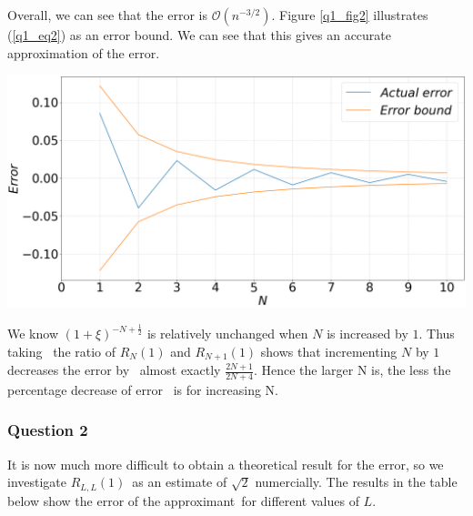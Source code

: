 \documentclass[12pt, a4paper]{article}
\begin{document}
Overall, we can see that the error is $\mathcal{O}(n^{-3/2})$.
Figure \ref{q1_fig2} illustrates (\ref{q1_eq2}) as an error bound. 
We can see that this gives an accurate approximation of the error.

\vspace{0.3cm}
\begin{minipage}{\textwidth}
	\includegraphics[width=\linewidth]{q1_fig2}
	\label{q1_fig2}
\end{minipage}
\vspace{0.4cm}

We know $(1+\xi)^{-N + \frac{1}{2}}$ is relatively unchanged when $N$ is increased by $1$. Thus taking \
the ratio of $R_{N}(1)$ and $R_{N+1}(1)$ shows that incrementing $N$ by $1$ decreases the error by \
almost exactly $\frac{ 2N+1 }{ 2N+4 }$. Hence the larger N is, the less the percentage decrease of error \
is for increasing N.

\newpage

\subsubsection*{Question 2}

It is now much more difficult to obtain a theoretical result for the error, so we investigate $R_{L,L}(1)$\
as an estimate of $\sqrt{2}$ numercially. The results in the table below show the error of the approximant\
for different values of $L$.
\vspace{0.3cm}
\end{document}
